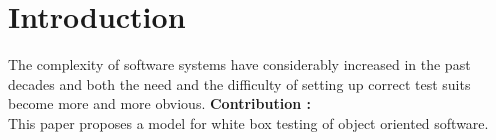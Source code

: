 \documentclass[a4paper]{report}
\begin{document}
\newtheorem{theorem}{Theorem}
\newtheorem{lemma}{Lemma:}

\renewcommand{\thetheorem}{\empty{}}
\renewcommand{\thelemma}{\arabic{lemma}} 

\newenvironment{proof}[1][Proof]{\begin{trivlist}
\item[\hskip \labelsep {\bfseries #1}]}{\end{trivlist}}
\newenvironment{definition}[1][Definition:\\]{\begin{trivlist}
\item[\hskip \labelsep {\bfseries #1}]}{\end{trivlist}}
\newenvironment{example}[1][Example]{\begin{trivlist}
\item[\hskip \labelsep {\bfseries #1}]}{\end{trivlist}}
\newenvironment{remark}[1][Rq:]{\begin{trivlist}
\item[\hskip \labelsep {\bfseries #1}]}{\end{trivlist}}
\newenvironment{rappel}[1][rappel:]{\begin{trivlist}
\item[\hskip \labelsep {\bfseries #1}]}{\end{trivlist}}
\newenvironment{NB}[1][NB:]{\begin{trivlist}
\item[\hskip \labelsep {\bfseries #1}]}{\end{trivlist}}


\chapter*{Introduction}
The complexity of software systems have considerably increased in the past decades and both the need and the difficulty of setting up correct test suits become more and more obvious.
\newline
\textbf{Contribution :}\\
This paper proposes a model for white box testing of object oriented software.



\end{document}

